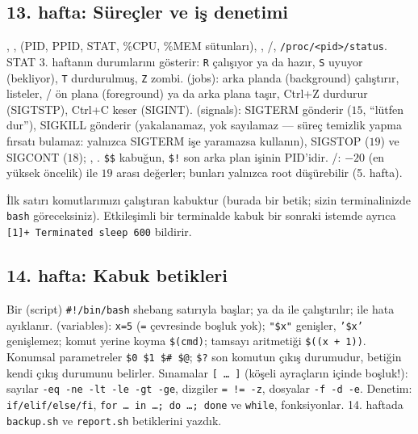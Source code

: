 \subsection{13. hafta: Süreçler ve iş denetimi}
, ,  (PID, PPID, STAT, \%CPU, \%MEM sütunları), , /, \texttt{/proc/<pid>/status}. STAT 3. haftanın durumlarını gösterir: \texttt{R} çalışıyor ya da hazır, \texttt{S} uyuyor (bekliyor), \texttt{T} durdurulmuş, \texttt{Z} zombi.  (jobs):  arka planda (background) çalıştırır,  listeler, / ön plana (foreground) ya da arka plana taşır, Ctrl+Z durdurur (SIGTSTP), Ctrl+C keser (SIGINT).  (signals):  SIGTERM gönderir ($15$, ``lütfen dur''),  SIGKILL gönderir (yakalanamaz, yok sayılamaz --- süreç temizlik yapma fırsatı bulamaz: yalnızca SIGTERM işe yaramazsa kullanın), SIGSTOP ($19$) ve SIGCONT ($18$); , . \texttt{\$\$} kabuğun, \texttt{\$!} son arka plan işinin PID'idir. /: $-20$ (en yüksek öncelik) ile $19$ arası değerler; bunları yalnızca root düşürebilir (5. hafta).

İlk  satırı komutlarımızı çalıştıran kabuktur (burada bir betik; sizin terminalinizde \texttt{bash} göreceksiniz). Etkileşimli bir terminalde kabuk bir sonraki istemde ayrıca \texttt{[1]+ Terminated sleep 600} bildirir.

\subsection{14. hafta: Kabuk betikleri}
Bir  (script) \texttt{\#!/bin/bash} shebang satırıyla başlar;  ya da  ile çalıştırılır;  ile hata ayıklanır.  (variables): \texttt{x=5} (\texttt{=} çevresinde boşluk yok); \texttt{"\$x"} genişler, \texttt{'\$x'} genişlemez; komut yerine koyma \texttt{\$(cmd)}; tamsayı aritmetiği \texttt{\$((x + 1))}. Konumsal parametreler \texttt{\$0 \$1 \$\# \$@}; \texttt{\$?} son komutun çıkış durumudur,  betiğin kendi çıkış durumunu belirler. Sınamalar \texttt{[ \dots\ ]} (köşeli ayraçların içinde boşluk!): sayılar \texttt{-eq -ne -lt -le -gt -ge}, dizgiler \texttt{= != -z}, dosyalar \texttt{-f -d -e}. Denetim:  \texttt{if/elif/else/fi},  \texttt{for \dots\ in \dots; do \dots; done} ve \texttt{while}, fonksiyonlar. 14. haftada \texttt{backup.sh} ve \texttt{report.sh} betiklerini yazdık.


